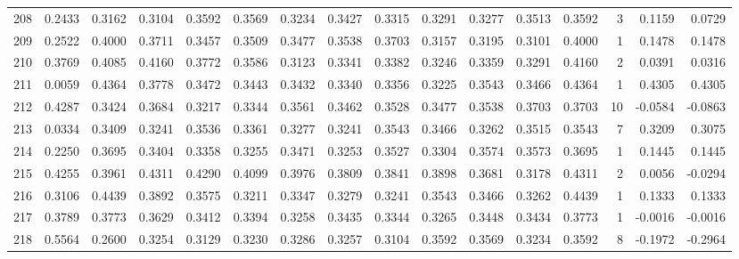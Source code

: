 \begin{tabular}{lrrrrrrrrrrrrrrr}
208 &      0.2433 &  0.3162 &  0.3104 &  0.3592 &  0.3569 &  0.3234 &  0.3427 &  0.3315 &  0.3291 &  0.3277 &   0.3513 &     0.3592 &      3 &                    0.1159 &                     0.0729 \\
209 &      0.2522 &  0.4000 &  0.3711 &  0.3457 &  0.3509 &  0.3477 &  0.3538 &  0.3703 &  0.3157 &  0.3195 &   0.3101 &     0.4000 &      1 &                    0.1478 &                     0.1478 \\
210 &      0.3769 &  0.4085 &  0.4160 &  0.3772 &  0.3586 &  0.3123 &  0.3341 &  0.3382 &  0.3246 &  0.3359 &   0.3291 &     0.4160 &      2 &                    0.0391 &                     0.0316 \\
211 &      0.0059 &  0.4364 &  0.3778 &  0.3472 &  0.3443 &  0.3432 &  0.3340 &  0.3356 &  0.3225 &  0.3543 &   0.3466 &     0.4364 &      1 &                    0.4305 &                     0.4305 \\
212 &      0.4287 &  0.3424 &  0.3684 &  0.3217 &  0.3344 &  0.3561 &  0.3462 &  0.3528 &  0.3477 &  0.3538 &   0.3703 &     0.3703 &     10 &                   -0.0584 &                    -0.0863 \\
213 &      0.0334 &  0.3409 &  0.3241 &  0.3536 &  0.3361 &  0.3277 &  0.3241 &  0.3543 &  0.3466 &  0.3262 &   0.3515 &     0.3543 &      7 &                    0.3209 &                     0.3075 \\
214 &      0.2250 &  0.3695 &  0.3404 &  0.3358 &  0.3255 &  0.3471 &  0.3253 &  0.3527 &  0.3304 &  0.3574 &   0.3573 &     0.3695 &      1 &                    0.1445 &                     0.1445 \\
215 &      0.4255 &  0.3961 &  0.4311 &  0.4290 &  0.4099 &  0.3976 &  0.3809 &  0.3841 &  0.3898 &  0.3681 &   0.3178 &     0.4311 &      2 &                    0.0056 &                    -0.0294 \\
216 &      0.3106 &  0.4439 &  0.3892 &  0.3575 &  0.3211 &  0.3347 &  0.3279 &  0.3241 &  0.3543 &  0.3466 &   0.3262 &     0.4439 &      1 &                    0.1333 &                     0.1333 \\
217 &      0.3789 &  0.3773 &  0.3629 &  0.3412 &  0.3394 &  0.3258 &  0.3435 &  0.3344 &  0.3265 &  0.3448 &   0.3434 &     0.3773 &      1 &                   -0.0016 &                    -0.0016 \\
218 &      0.5564 &  0.2600 &  0.3254 &  0.3129 &  0.3230 &  0.3286 &  0.3257 &  0.3104 &  0.3592 &  0.3569 &   0.3234 &     0.3592 &      8 &                   -0.1972 &                    -0.2964 \\

\end{tabular}
